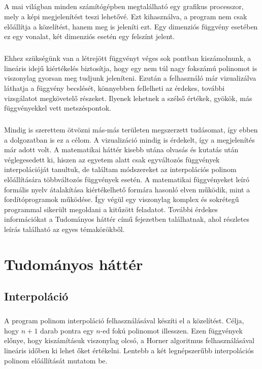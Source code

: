 \documentclass{elteikthesis}
\begin{document}
\paragraph{}
A mai világban minden számítógépben megtalálható egy grafikus processzor, mely a képi megjelenítést teszi lehetővé. Ezt kihasználva, a program nem csak előállítja a közelítést, hanem meg is jeleníti ezt. Egy dimenziós függvény esetében ez egy vonalat, két dimenziós esetén egy felszínt jelent.
\paragraph{}
Ehhez szükségünk van a létrejött függvényt véges sok pontban kiszámolnunk, a lineáris idejű kiértékelés biztosítja, hogy egy nem túl nagy fokszámú polinomot is viszonylag gyorsan meg tudjunk jeleníteni. Ezután a felhasználó már vizualizálva láthatja a függvény becslését, könnyebben fellelheti az érdekes, további vizsgálatot megkövetelő részeket. Ilyenek lehetnek a szélső értékek, gyökök, más függvényekkel vett metszéspontok.
\paragraph{}
Mindig is szerettem ötvözni más-más területen megszerzett tudásomat, így ebben a dolgozatban is ez a célom. A vizualizáció mindig is érdekelt, így a megjelenítés már adott volt. A matematikai háttér kisebb utána olvasás és kutatás után véglegesedett ki, hiszen az egyetem alatt csak egyváltozós függvények interpolációját tanultuk, de találtam módszereket az interpolációs polinom előállítására többváltozós függvények esetén. A matematikai függvényeket leíró formális nyelv átalakítása kiértékelhető formára hasonló elven működik, mint a fordítóprogramok működése. Így végül egy viszonylag komplex és sokrétegű programmal sikerült megoldani a kitűzött feladatot. További érdekes információkat a Tudományos háttér című fejezetben találhatnak, ahol részletes leírás található az egyes témakörökből.

\chapter{Tudományos háttér}
\section{Interpoláció}
\paragraph{}
A program polinom interpoláció felhasználásával készíti el a közelítést. Célja, hogy $n+1$ darab pontra egy $n$-ed fokú polinomot illesszen. Ezen függvények előnye, hogy kiszámításuk viszonylag olcsó, a Horner algoritmus felhasználásával lineáris időben ki lehet őket értékelni. Lentebb a két legnépszerűbb interpolációs polinom előállítását mutatom be. 
\end{document}
